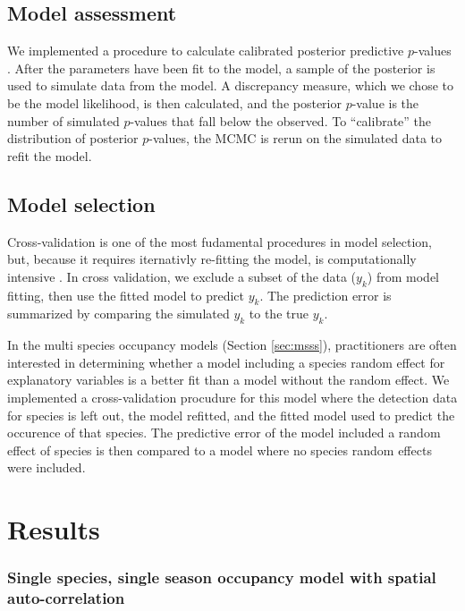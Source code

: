 \documentclass[12pt]{article}
\begin{document}
\subsection*{Model assessment}
\label{sec:assess}

We implemented a procedure to calculate calibrated posterior
predictive $p$-values \citep{hjort-etal-06}. After the parameters have
been fit to the model, a sample of the posterior is used to simulate
data from the model. A discrepancy measure, which we chose to be the
model likelihood, is then calculated, and the posterior $p$-value is
the number of simulated $p$-values that fall below the observed. To
``calibrate'' the distribution of posterior $p$-values, the MCMC is
rerun on the simulated data to refit the model. 

\subsection*{Model selection}
\label{sec:select}

Cross-validation is one of the most fudamental procedures in model
selection, but, because it requires iternativly re-fitting the model,
is computationally intensive \citep{hooten2014guide}. In cross
validation, we exclude a subset of the data ($y_k$) from model
fitting, then use the fitted model to predict $y_k$. The prediction
error is summarized by comparing the simulated $y_k$ to the true $y_k$.

In the multi species occupancy models (Section \ref{sec:msss}),
practitioners are often interested in determining whether a model
including a species random effect for explanatory variables is a
better fit than a model without the random effect. We implemented a
cross-validation procudure for this model where the detection data for
species is left out, the model refitted, and the fitted model used to
predict the occurence of that species. The predictive error of the
model included a random effect of species is then compared to a model
where no species random effects were included.

\section*{Results}
\label{sec:results}
\subsubsection*{Single species, single season occupancy model with
  spatial auto-correlation}
\end{document}
